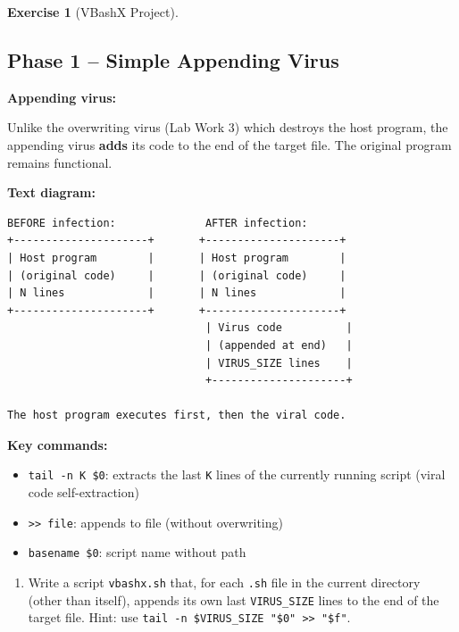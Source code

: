 \documentclass[a4paper,11pt]{article}
\theoremstyle{plain}
\theoremstyle{definition}
\newtheorem{exercice}{Exercise}
\begin{document}
\begin{exercice}[VBashX Project]$\;$


\subsection*{Phase 1 -- Simple Appending Virus}

\begin{rappel}
\textbf{Appending virus:}

Unlike the overwriting virus (Lab Work 3) which destroys the host program, the appending virus \textbf{adds} its code to the end of the target file. The original program remains functional.

\medskip
\textbf{Text diagram:}
\begin{lstlisting}[numbers=none,frame=none,backgroundcolor=\color{white},language={}]
BEFORE infection:              AFTER infection:
+---------------------+       +---------------------+
| Host program        |       | Host program        |
| (original code)     |       | (original code)     |
| N lines             |       | N lines             |
+---------------------+       +---------------------+
                               | Virus code          |
                               | (appended at end)   |
                               | VIRUS_SIZE lines    |
                               +---------------------+

The host program executes first, then the viral code.
\end{lstlisting}

\medskip
\textbf{Key commands:}
\begin{itemize}
    \item \texttt{tail -n K \$0}: extracts the last \texttt{K} lines of the currently running script (viral code self-extraction)
    \item \texttt{>> file}: appends to file (without overwriting)
    \item \texttt{basename \$0}: script name without path
\end{itemize}
\end{rappel}

\begin{enumerate}
\item[\textbf{1a)}] Write a script \texttt{vbashx.sh} that, for each \texttt{.sh} file in the current directory (other than itself), appends its own last \texttt{VIRUS\_SIZE} lines to the end of the target file. Hint: use \texttt{tail~-n~\$VIRUS\_SIZE~"\$0"~>>~"\$f"}.


\end{enumerate}
\end{exercice}
\end{document}
